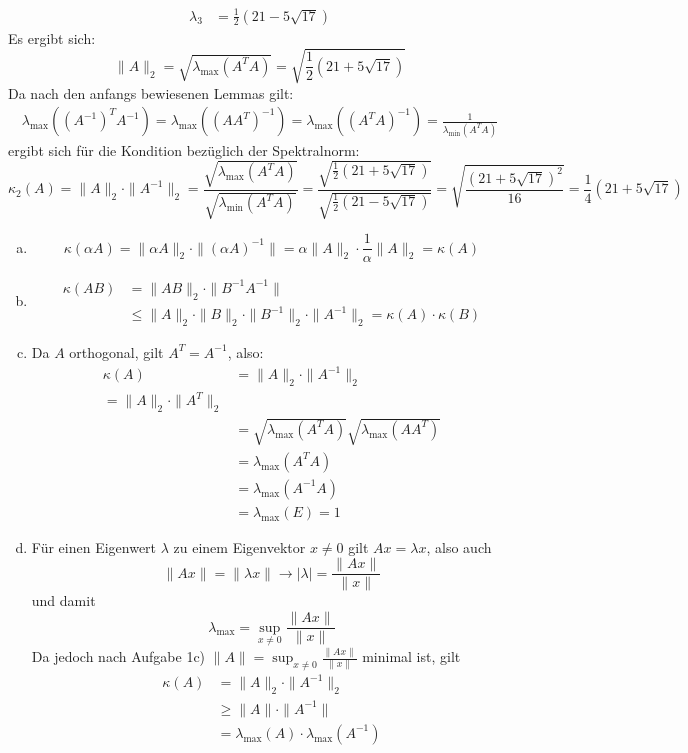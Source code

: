 \documentclass[a4paper]{scrartcl}
\begin{document}
\begin{aufgabe}
\begin{align*}
		\lambda_3&=\frac 12(21-5\sqrt{17})
	\end{align*}
	Es ergibt sich:
	\[
		\|A\|_2=\sqrt{\lambda_{\text{max}}(A^TA)}=\sqrt{\frac 12(21+5\sqrt{17})}
	\]
	Da nach den anfangs bewiesenen Lemmas gilt:
	\begin{align*}
		\lambda_{\text{max}}((A^{-1})^TA^{-1})
		=\lambda_{\text{max}}((AA^T)^{-1})
		=\lambda_{\text{max}}((A^TA)^{-1})
		=\frac 1{\lambda_{\text{min}}(A^TA)}
	\end{align*}
	ergibt sich für die Kondition bezüglich der Spektralnorm:
	\[
		\kappa_2(A)
		=\|A\|_2\cdot\|A^{-1}\|_2
		=\frac{\sqrt{\lambda_{\text{max}}(A^TA)}}{\sqrt{\lambda_{\text{min}}(A^TA)}}
		=\frac {\sqrt{\frac 12(21+5\sqrt{17})}}{\sqrt{\frac 12(21-5\sqrt{17})}}
		=\sqrt{\frac{(21+5\sqrt{17})^2}{16}}
		=\frac 14(21+5\sqrt{17})
	\]

\end{aufgabe}

\begin{aufgabe}
	\begin{enumerate}[(a)]
		\item
			\[
				\kappa(\alpha A)=\|\alpha A\|_2\cdot\|(\alpha A)^{-1}\|=\alpha\|A\|_2\cdot\frac 1\alpha\|A\|_2=\kappa(A)
			\]
		\item
			\begin{align*}
				\kappa(AB)&=\|AB\|_2\cdot\|B^{-1}A^{-1}\|\\
						  &\le\|A\|_2\cdot\|B\|_2\cdot\|B^{-1}\|_2\cdot\|A^{-1}\|_2=\kappa(A)\cdot\kappa(B)
			\end{align*}
		\item
			Da $A$ orthogonal, gilt $A^T=A^{-1}$, also:
			\begin{align*}
				\kappa(A)
				&=\|A\|_2\cdot\|A^{-1}\|_2\\
				=\|A\|_2\cdot\|A^T\|_2\\
				&=\sqrt{\lambda_{\text{max}}(A^TA)}\sqrt{\lambda_{\text{max}}(AA^T)}\\
				&=\lambda_{\text{max}}(A^TA)\\
				&=\lambda_{\text{max}}(A^{-1}A)\\
				&=\lambda_{\text{max}}(E)=1
			\end{align*}
		\item
			Für einen Eigenwert $\lambda$ zu einem Eigenvektor $x\neq 0$ gilt $Ax=\lambda x$, also auch
			\[
				\|Ax\|=\|\lambda x\| \longrightarrow |\lambda|=\frac {\|Ax\|}{\|x\|}
			\]
			und damit
			\[
				\lambda_{\text{max}}=\sup_{x\neq 0}\frac {\|Ax\|}{\|x\|}
			\]
			Da jedoch nach Aufgabe 1c) $\|A\|=\sup_{x\neq 0}\frac {\|Ax\|}{\|x\|}$ minimal ist, gilt
			\begin{align*}
				\kappa(A)&=\|A\|_2\cdot\|A^{-1}\|_2\\
					&\ge \|A\|\cdot \|A^{-1}\|\\
					&=\lambda_{\text{max}}(A)\cdot \lambda_{\text{max}}(A^{-1})
			\end{align*}
	\end{enumerate}
\end{aufgabe}
\end{document}
